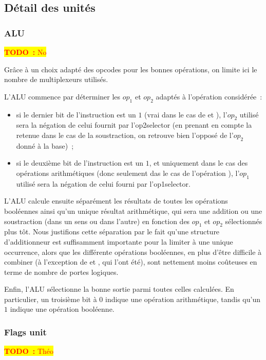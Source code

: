 \documentclass[11pt,a4paper]{article}
\newcommand{\todo}[1]{\colorbox{yellow}{\textcolor{red}{\textbf{TODO~:} #1}}}
\begin{document}
\subsection{Détail des unités}

\subsubsection{ALU}
\todo{No}

Grâce à un choix adapté des opcodes pour les bonnes opérations, on limite ici le nombre de multiplexeurs utilisés.

L'ALU commence par déterminer les $op_1$ et $op_2$ adaptés à l'opération considérée~:
\begin{itemize}

\item si le dernier bit de l'instruction est un $1$ (vrai dans le cas de  et ), l'$op_2$ utilisé sera la négation de celui fournit par l'op2selector (en prenant en compte la retenue dans le cas de la soustraction, on retrouve bien l'opposé de l'$op_2$ donné à la base)~;

\item si le deuxième bit de l'instruction est un $1$, et uniquement dans le cas des opérations arithmétiques (donc seulement das le cas de l'opération ), l'$op_1$ utilisé sera la négation de celui fourni par l'op1selector.

\end{itemize}

L'ALU calcule ensuite séparément les résultats de toutes les opérations booléennes ainsi qu'un unique résultat arithmétique, qui sera une addition ou une soustraction (dans un sens ou dans l'autre) en fonction des $op_1$ et $op_2$ sélectionnés plus tôt. Nous justifions cette séparation par le fait qu'une structure d'additionneur est suffisamment importante pour la limiter à une unique occurrence, alors que les différente opérations booléennes, en plus d'être difficile à combiner (à l'exception de  et , qui l'ont été), sont nettement moins coûteuses en terme de nombre de portes logiques.

Enfin, l'ALU sélectionne la bonne sortie parmi toutes celles calculées. En particulier, un troisième bit à $0$ indique une opération arithmétique, tandis qu'un $1$ indique une opération booléenne.

\subsubsection{Flags unit}
\todo{Théo}
\end{document}
